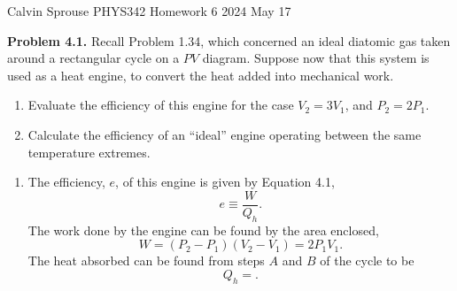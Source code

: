 \documentclass[a4paper, 12pt]{config/homework}
\begin{document}
\noindent
Calvin Sprouse \hfill PHYS342 Homework 6 \hfill 2024 May 17

\bigskip\noindent
\textbf{Problem 4.1.} Recall Problem 1.34, which concerned an ideal diatomic gas taken around a rectangular cycle on a \(PV\) diagram. Suppose now that this system is used as a heat engine, to convert the heat added into mechanical work.
\begin{enumerate}[label=\textbf{(\alph*)}]
\item Evaluate the efficiency of this engine for the case \(V_2 = 3V_1\), and \(P_2 = 2P_1\).
\item Calculate the efficiency of an ``ideal'' engine operating between the same temperature extremes.
\end{enumerate}
\begin{enumerate}[label=\textbf{(\alph*)}]
\bigskip
\item The efficiency, \(e\), of this engine is given by Equation 4.1,
\[e \equiv \frac{W}{Q_h}.\]
The work done by the engine can be found by the area enclosed,
\[W = \left(P_2 - P_1\right)\left(V_2 - V_1\right) = 2 P_1 V_1.\]
The heat absorbed can be found from steps \(A\) and \(B\) of the cycle to be
\[Q_h = .\]
\end{enumerate}
\end{document}
